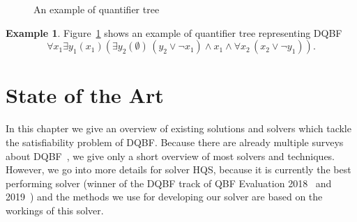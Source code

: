 \documentclass[
  digital, %
  twoside, %
  table,   %
  nolof,     %
  nolot,     %
]{fithesis3}
\theoremstyle{definition}
\newtheorem{example}{Example}
\theoremstyle{remark}
\newcommand{\itholds}{\,}
\begin{document}
\begin{figure}[ht]
    \centering
    \caption{An example of quantifier tree}
    \label{fig:QTex}
\end{figure}

\begin{example}
  Figure~\ref{fig:QTex} shows an example of quantifier tree representing DQBF \[\forall x_1 \exists y_1(x_1) (\exists y_2(\emptyset) \itholds (y_2 \lor \neg x_1) \land x_1 \land \forall x_2 \itholds (x_2 \lor \neg y_1)).\]
\end{example}


\chapter{State of the Art}
In this chapter we give an overview of existing solutions and solvers which tackle the satisfiability problem of DQBF. Because there are already multiple surveys about DQBF~\cite{DQBFStateOfArtTalk,DQBFStateOfArt,DQBFStateOfArtNew}, we give only a short overview of most solvers and techniques. However, we go into more details for solver HQS, because it is currently the best performing solver (winner of the DQBF track of QBF Evaluation 2018~\cite{QBFeval18} and 2019~\cite{QBFeval19}) and the methods we use for developing our solver are based on the workings of this solver.
\end{document}
